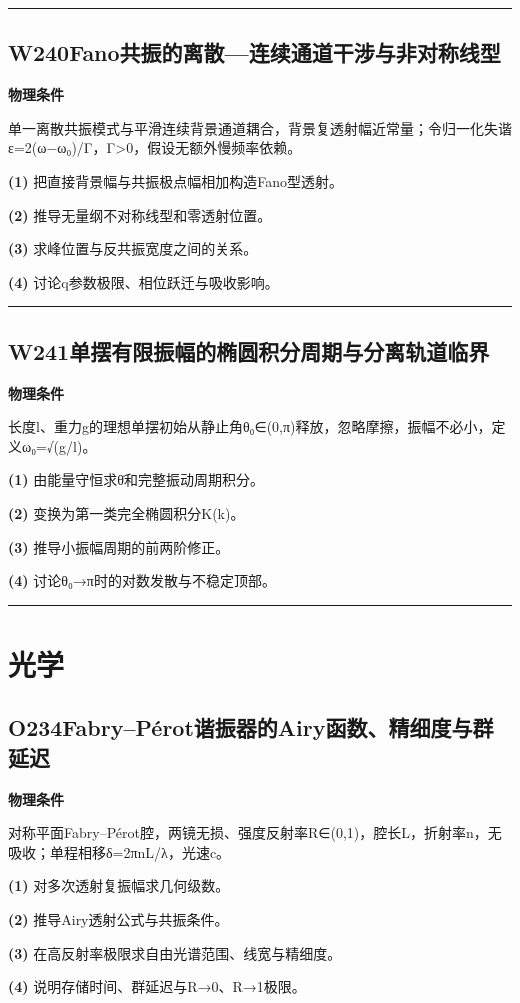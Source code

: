 \documentclass[UTF8,a4paper,11pt,oneside,openany]{ctexbook}
\begin{document}
\par\bigskip\hrule\bigskip
\section*{W240\quad Fano共振的离散—连续通道干涉与非对称线型}
\textbf{物理条件}\par 单一离散共振模式与平滑连续背景通道耦合，背景复透射幅近常量；令归一化失谐ε=2(ω−ω₀)/Γ，Γ>0，假设无额外慢频率依赖。
\par\noindent\textbf{(1)} 把直接背景幅与共振极点幅相加构造Fano型透射。
\par\noindent\textbf{(2)} 推导无量纲不对称线型和零透射位置。
\par\noindent\textbf{(3)} 求峰位置与反共振宽度之间的关系。
\par\noindent\textbf{(4)} 讨论q参数极限、相位跃迁与吸收影响。

\par\bigskip\hrule\bigskip
\section*{W241\quad 单摆有限振幅的椭圆积分周期与分离轨道临界}
\textbf{物理条件}\par 长度l、重力g的理想单摆初始从静止角θ₀∈(0,π)释放，忽略摩擦，振幅不必小，定义ω₀=√(g/l)。
\par\noindent\textbf{(1)} 由能量守恒求θ̇和完整振动周期积分。
\par\noindent\textbf{(2)} 变换为第一类完全椭圆积分K(k)。
\par\noindent\textbf{(3)} 推导小振幅周期的前两阶修正。
\par\noindent\textbf{(4)} 讨论θ₀→π时的对数发散与不稳定顶部。

\par\bigskip\hrule\bigskip
\chapter{光学}
\section*{O234\quad Fabry–Pérot谐振器的Airy函数、精细度与群延迟}
\textbf{物理条件}\par 对称平面Fabry–Pérot腔，两镜无损、强度反射率R∈(0,1)，腔长L，折射率n，无吸收；单程相移δ=2πnL/λ，光速c。
\par\noindent\textbf{(1)} 对多次透射复振幅求几何级数。
\par\noindent\textbf{(2)} 推导Airy透射公式与共振条件。
\par\noindent\textbf{(3)} 在高反射率极限求自由光谱范围、线宽与精细度。
\par\noindent\textbf{(4)} 说明存储时间、群延迟与R→0、R→1极限。
\end{document}
